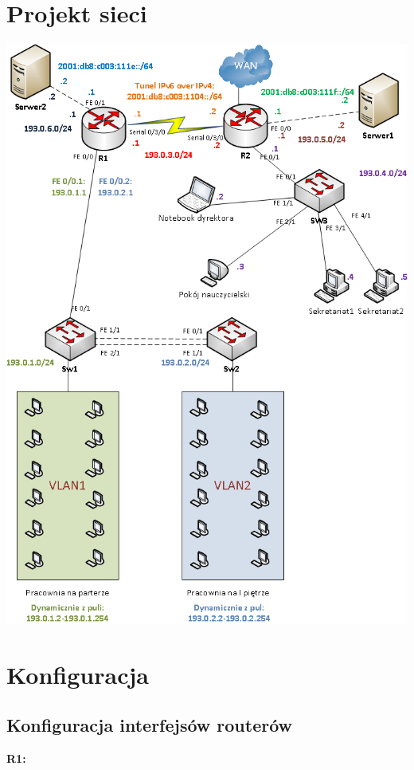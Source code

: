 \documentclass[11pt,a4paper]{article}
\begin{document}
\section{Projekt sieci}
\includegraphics[scale=0.6]{siec.png}  

\section{Konfiguracja}

\subsection{Konfiguracja interfejsów routerów}
{\bf R1:}\\
\noindent
\end{document}

